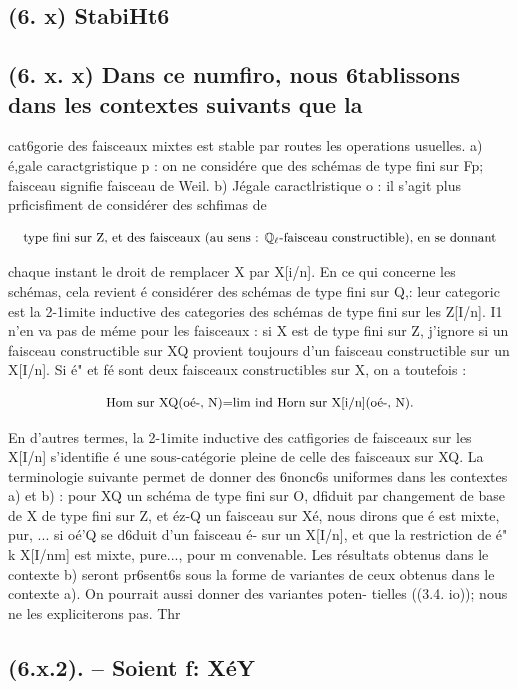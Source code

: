 \documentclass[11pt]{article}
\theoremstyle{remark}
\begin{document}
\subsection*{(6. x) StabiHt6}

\subsection*{(6. x. x) Dans ce numfiro, nous 6tablissons dans les contextes suivants que la}

cat6gorie des faisceaux mixtes est stable par routes les operations usuelles. a) é,gale caractgristique p : on ne considére que des schémas de type fini sur Fp; faisceau signifie faisceau de Weil. b) Jégale caractlristique o : il s'agit plus prficisfiment de considérer des schfimas de

\[\text{\small type fini sur Z, et des faisceaux (au sens : \(\mathbb{Q}_{\ell}\)-faisceau constructible), en se donnant}\]

chaque instant le droit de remplacer X par X[i/n]. En ce qui concerne les schémas, cela revient é considérer des schémas de type fini sur Q,: leur categoric est la 2-1imite inductive des categories des schémas de type fini sur les Z[I/n]. I1 n'en va pas de méme pour les faisceaux : si X est de type fini sur Z, j'ignore si un faisceau constructible sur XQ provient toujours d'un faisceau constructible sur un X[I/n]. Si é" et fé sont deux faisceaux constructibles sur X, on a toutefois :

\[\text{\small Hom sur XQ(oé-, N)=lim ind Horn sur X[i/n](oé-, N).}\]

En d'autres termes, la 2-1imite inductive des catfigories de faisceaux sur les X[I/n] s'identifie é une sous-catégorie pleine de celle des faisceaux sur XQ. La terminologie suivante permet de donner des 6nonc6s uniformes dans les contextes a) et b) : pour XQ un schéma de type fini sur O, dfiduit par changement de base de X de type fini sur Z, et éz-Q un faisceau sur Xé, nous dirons que é est mixte, pur, ... si oé'Q se d6duit d'un faisceau é- sur un X[I/n], et que la restriction de é" k X[I/nm] est mixte, pure..., pour m convenable. Les résultats obtenus dans le contexte b) seront pr6sent6s sous la forme de variantes de ceux obtenus dans le contexte a). On pourrait aussi donner des variantes poten- tielles ((3.4. io)); nous ne les expliciterons pas. Thr

\subsection*{(6.x.2). -- Soient f: XéY}
\end{document}
